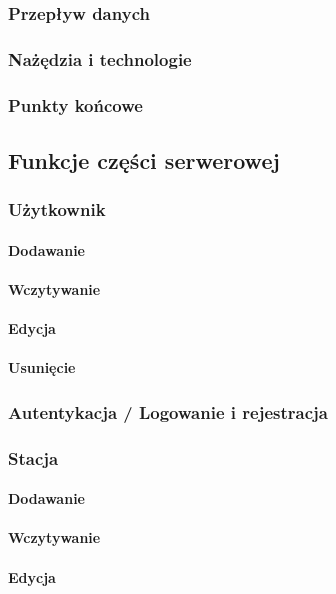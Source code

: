 \subsubsection{Przepływ danych}
\subsubsection{Nażędzia i technologie}
\subsubsection{Punkty końcowe}
\subsection{Funkcje części serwerowej}
\subsubsection{Użytkownik}
\paragraph{Dodawanie}
\paragraph{Wczytywanie}
\paragraph{Edycja}
\paragraph{Usunięcie}
\subsubsection{Autentykacja / Logowanie i rejestracja}
\subsubsection{Stacja}
\paragraph{Dodawanie}
\paragraph{Wczytywanie}
\paragraph{Edycja}
